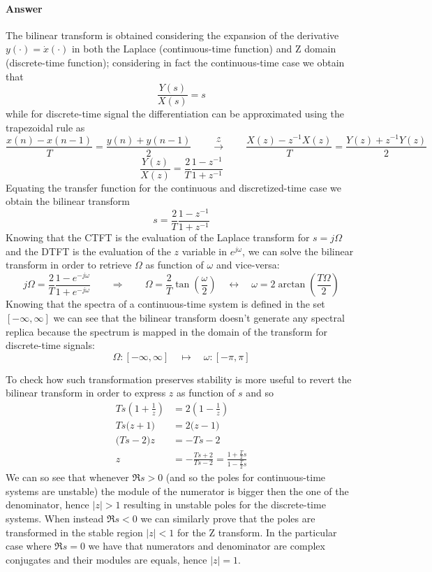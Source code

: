 	\paragraph{Answer} The bilinear transform is obtained considering the expansion of the derivative $y(\cdot) = \dot x(\cdot)$ in both the Laplace (continuous-time function) and Z domain (discrete-time function); considering in fact the continuous-time case we obtain that
	\[ \frac{Y(s)}{X(s)} = s \]
	while for discrete-time signal the differentiation can be approximated using the trapezoidal rule as
	\[ \frac{x(n) - x(n-1)}{T} = \frac{y(n)+y(n-1)}{2} \qquad \xrightarrow{\mathcal Z} \qquad \frac{X(z) - z^{-1}X(z)}T = \frac{Y(z) + z^{-1}Y(z)}{2}  \]
	\[ \frac{Y(z)}{X(z)} = \frac{2}{T} \frac{1-z^{-1}}{1+z^{-1}} \]
	Equating the transfer function for the continuous and discretized-time case we obtain the bilinear transform
	\[ s = \frac{2}{T} \frac{1-z^{-1}}{1+z^{-1}} \]
	Knowing that the CTFT is the evaluation of the Laplace transform for $s=j\Omega$ and the DTFT is the evaluation of the $z$ variable in $e^{j\omega}$, we can solve the bilinear transform in order to retrieve $\Omega$ as function of $\omega$ and vice-versa:
	\[ j\Omega = \frac 2 T \frac{1-e^{-j\omega}}{1+e^{-j\omega}} \qquad \Rightarrow \qquad \Omega = \frac 2 T \tan\left(\frac \omega 2\right) \quad \leftrightarrow \quad \omega = 2 \arctan\left( \frac{T\Omega}{2} \right)\]
	Knowing that the spectra of a continuous-time system is defined in the set $[-\infty,\infty]$ we can see that the bilinear transform doesn't generate any spectral replica because the spectrum is mapped in the domain of the transform for discrete-time signals:
	\[ \Omega: [-\infty,\infty] \quad \mapsto \quad \omega:[-\pi,\pi] \]
	
	To check how such transformation preserves stability is more useful to revert the bilinear transform in order to express $z$ as function of $s$ and so
	\begin{align*}
		Ts \left( 1 + \frac 1 z\right) & = 2 \left(1 - \frac 1 z\right) \\
		Ts \big(z+1\big) & = 2\big(z-1\big) \\
		\big(Ts-2\big) z & = -Ts - 2 \\
		z &= - \frac{Ts + 2}{Ts-2} = \frac{1 +\frac T2 s}{1 - \frac T2 s}
	\end{align*}
	We can so see that whenever $\Re{s} > 0 $ (and so the poles for continuous-time systems are unstable) the module of the numerator is bigger then the one of the denominator, hence $|z|>1$ resulting in unstable poles for the discrete-time systems. When instead $\Re{s}<0$ we can similarly prove that the poles are transformed in the stable region $|z|<1$ for the Z transform. In the particular case where $\Re{s} = 0$ we have that numerators and denominator are complex conjugates and their modules are equals, hence $|z| = 1$.
	

